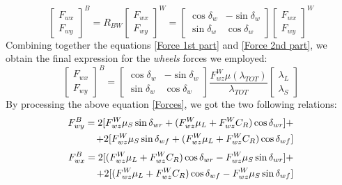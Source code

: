 \documentclass[a4paper,12pt,titlepage]{report}
\numberwithin{figure}{section}
\begin{document}
		\begin{equation} \label{Force 2nd part}
			\begin{bmatrix}
				F_{wx} \\
				F_{wy}
			\end{bmatrix}^{B} =	
		R_{BW}
			\begin{bmatrix}
				F_{wx} \\
				F_{wy}
				\end{bmatrix}^{W} =
				\begin{bmatrix}
				\cos\delta_{w} & -\sin\delta_{w} \\
				\sin\delta_{w} & \cos\delta_{w}
			\end{bmatrix}
			\begin{bmatrix}
				F_{wx} \\
				F_{wy}
			\end{bmatrix}^{W}
		\end{equation}
	Combining together the equations \ref{Force 1st part} and \ref{Force 2nd part}, we obtain the final expression for the \textit{wheels} forces we employed:
		\begin{equation} \label{Forces}
			\begin{bmatrix}
		F_{wx} \\
		F_{wy}
			\end{bmatrix}^{B} =	
			\begin{bmatrix}
				\cos\delta_{w} & -\sin\delta_{w} \\
				\sin\delta_{w} & \cos\delta_{w}
			\end{bmatrix}
				\frac{F_{wz}^{W} \mu(\lambda_{TOT})}{\lambda_{TOT}}
			\begin{bmatrix}
				\lambda_{L} \\
				\lambda_{S}
			\end{bmatrix}
		\end{equation}
	By processing the above equation \ref{Forces}, we got the two following relations:
		\begin{equation} \label{F_{wy}}
			\begin{split}
				F_{wy}^{B} = 2 [F_{wz}^{W} \mu_{S}\sin\delta_{wr} + (F_{wz}^{W} \mu_{L} + F_{wz}^{W} C_{R}) \cos\delta_{wr}] + \\ + 2 [F_{wz}^{W} \mu_{S}\sin\delta_{wf} + (F_{wz}^{W} \mu_{L} + F_{wz}^{W} C_{R})\cos\delta_{wf}] 
			\end{split}
		\end{equation}
		\begin{equation} \label{F_{wx}}
			\begin{split}
				F_{wx}^{B} = 2 [(F_{wz}^{W} \mu_{L} + F_{wz}^{W} C_{R})\cos\delta_{wr} - F_{wz}^{W} \mu_{S}\sin\delta_{wr}] + \\ + 2 [(F_{wz}^{W} \mu_{L} + F_{wz}^{W} C_{R})\cos\delta_{wf} - F_{wz}^{W} \mu_{S}\sin\delta_{wf}] 
			\end{split}
		\end{equation}
\end{document}
